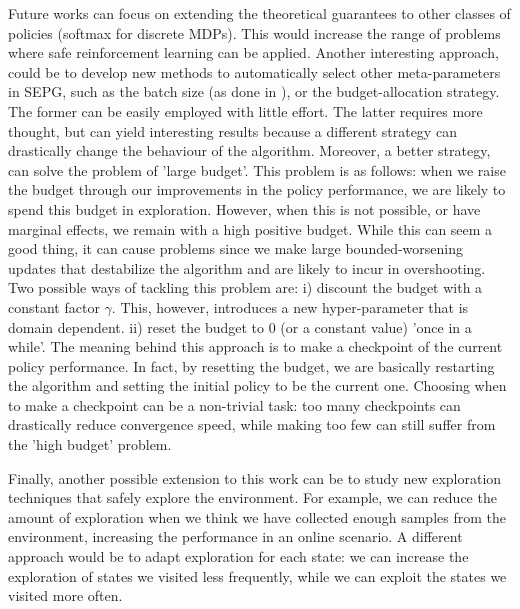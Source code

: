 Future works can focus on extending the theoretical guarantees to other classes of policies (\eg softmax for discrete MDPs). This would increase the range of problems where safe reinforcement learning can be applied. Another interesting approach, could be to develop new methods to automatically select other meta-parameters in SEPG, such as the batch size (as done in \cite{adaptive_batch}), or the budget-allocation strategy. The former can be easily employed with little effort. The latter requires more thought, but can yield interesting results because a different strategy can drastically change the behaviour of the algorithm. 
Moreover, a better strategy, can solve the problem of 'large budget'. This problem is as follows: 
when we raise the budget through our improvements in the policy performance, we are likely to spend this budget in exploration. However, when this is not possible, or have marginal effects, we remain with a high positive budget. While this can seem a good thing, it can cause problems since we make large bounded-worsening updates that destabilize the algorithm and are likely to incur in overshooting.
Two possible ways of tackling this problem are: i) discount the budget with a constant factor $\gamma$. This, however, introduces a new hyper-parameter that is domain dependent. ii) reset the budget to 0 (or a constant value) 'once in a while'. The meaning behind this approach is to make a checkpoint of the current policy performance. In fact, by resetting the budget, we are basically restarting the algorithm and setting the initial policy to be the current one. Choosing when to make a checkpoint can be a non-trivial task: too many checkpoints can drastically reduce convergence speed, while making too few can still suffer from the 'high budget' problem. 


Finally, another possible extension to this work can be to study new exploration techniques that safely explore the environment. For example, we can reduce the amount of exploration when we think we have collected enough samples from the environment, increasing the performance in an online scenario. A different approach would be to adapt exploration for each state: we can increase the exploration of states we visited less frequently, while we can exploit the states we visited more often.
